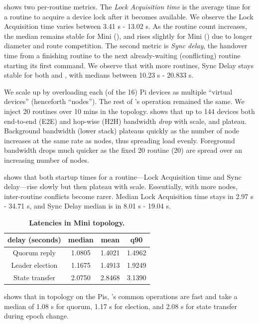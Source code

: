  shows two per-routine metrics.  The {\it Lock Acquisition time} is the average time for a routine to acquire a device lock after it becomes available. We observe the Lock Acquisition time varies
 between 3.41 s - 13.02 s.
As the routine count increases, the median
remains stable for Mini \Grid{} (\MSF), and rises slightly for Mini \Bldg {} (\Mob) due to longer diameter and route competition.
The second metric is  {\it Sync delay}, the handover time from a finishing routine to the next already-waiting (conflicting) routine starting its first command.
We observe that with more  routines,  Sync Delay stays  stable for both \Mob{} and \MSF{},
with medians between 10.23 s - 20.833 s.

 We scale up
by overloading each (of the 16) Pi devices as multiple ``virtual devices'' (henceforth ``nodes''). The rest of \sysname's operation remained the same. We inject 20 routines over 10 mins in the \Minigrid{} topology.   shows that up to 144 devices both end-to-end (E2E) and hop-wise (H2H) bandwidth {\it drop} with scale, and plateau. Background bandwidth (lower stack) plateaus quickly as the number of node \kgroups{} increases at the same rate as nodes, thus spreading load evenly.  Foreground bandwidth drops much quicker as the fixed 20 routine \kgroups{} (20) are spread over an increasing number of nodes. 

 shows that both startup times for a routine---Lock Acquisition time and Sync delay---rise slowly but then plateau with scale.  Essentially, with more nodes, inter-routine conflicts become rarer.  
Median Lock Acquisition time stays in  2.97 s - 34.71 s, and  Sync Delay median is in 8.01 s - 19.04 s.

\begin{table}[tb!]
    \centering
    \caption{\bf \small \Kgroup{} Latencies in  Mini \Grid{} topology.
    }
    \bigskip
    \label{comesh:tab:kgroup_latencies}
    \footnotesize
    \begin{tabular}{c c c c}
        \hline
        \bf{\Kgroup{} delay (seconds)} & \bf{median} & \bf{mean} & \bf{q90} \\
        \hline
        Quorum reply & 1.0805 & 1.4021 & 1.4962 \\
        Leader election & 1.1675 & 1.4913 & 1.9249 \\
        State transfer & 2.0750 & 2.8468 & 3.1390 \\
        \hline
    \end{tabular}
\end{table}

 shows that in \MSF{} topology on the Pis, 
\sysname's common operations are fast and take a median of 1.08 s for quorum, 1.17 s for election, and 2.08 s for state transfer during epoch change.
